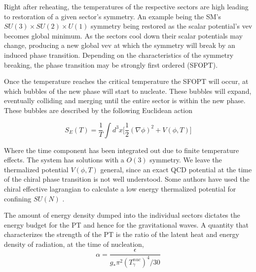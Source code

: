 \documentclass[nofootinbib,twocolumn,preprintnumbers]{revtex4-1}
\begin{document}
\vspace{1em }
Right after reheating, the temperatures of the respective sectors are high leading to restoration of a given sector's symmetry.  An example being the SM's $SU(3) \times SU(2) \times U(1)$ symmetry being restored as the scalar potential's vev becomes global minimum. As the sectors cool down their scalar potentials may change, producing a new global vev at which the symmetry will break by an induced phase transition. Depending on the characteristics of the symmetry breaking, the phase transition may be strongly first ordered (SFOPT).  

Once the temperature reaches the critical temperature the SFOPT will occur, at which bubbles of the new phase will start to nucleate. These bubbles will expand, eventually colliding and merging until the entire sector is within the new phase.  These bubbles are described by the following Euclidean action


\begin{equation}
S_{E}(T) = \frac{1}{T}\int d^3x \bigg[\frac{1}{2}(\nabla\phi)^2 + V(\phi,T)  \bigg]
\end{equation}

Where the time component has been integrated out due to finite temperature effects. The system has solutions with a $O(3)$ symmetry. We leave the thermalized potential $V(\phi, T)$ general, since an exact QCD potential at the time of the chiral phase transition is not well understood. Some authors have used the chiral effective lagrangian to calculate a low energy thermalized potential for confining $SU(N)$ .

The amount of energy density dumped into the individual sectors dictates the energy budget for the PT and hence for the gravitational waves.  A quantity that characterizes the strength of the PT is the ratio of the latent heat and energy density of radiation, at the time of nucleation, 
\begin{equation}
\alpha = \frac{\epsilon}{g_{*} \pi^2 (T^{nuc}_{\gamma})^4/30}
\end{equation}
\end{document}
